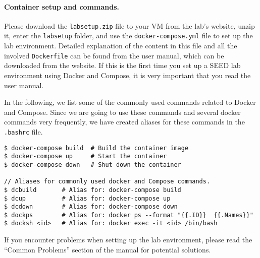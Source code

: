 

\paragraph{Container setup and commands.}
Please download the
\texttt{labsetup.zip} file to your VM from the lab's website,
unzip it, enter the \texttt{labsetup} folder, and 
use the \texttt{docker-compose.yml} file to 
set up the lab environment. Detailed explanation
of the content in this file and all the involved 
\texttt{Dockerfile} can be found from the 
user manual, which can be downloaded from the website. 
If this is the first time you set up a SEED lab environment
using Docker and Compose, it is very important that you read 
the user manual. 

In the following, we list some of the commonly
used commands related to Docker and Compose. 
Since we are going to use 
these commands and several docker commands very
frequently, we have created aliases for these commands
in the \texttt{.bashrc} file.  


\begin{lstlisting}
$ docker-compose build  # Build the container image
$ docker-compose up     # Start the container
$ docker-compose down   # Shut down the container

// Aliases for commonly used docker and Compose commands. 
$ dcbuild       # Alias for: docker-compose build
$ dcup          # Alias for: docker-compose up
$ dcdown        # Alias for: docker-compose down
$ dockps        # Alias for: docker ps --format "{{.ID}}  {{.Names}}" 
$ docksh <id>   # Alias for: docker exec -it <id> /bin/bash
\end{lstlisting}


If you encounter problems when setting up the lab environment, 
please read the ``Common Problems'' section of the manual
for potential solutions.

